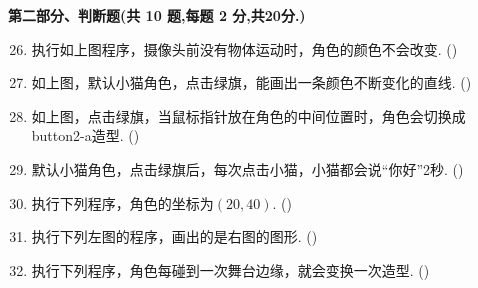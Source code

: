 \documentclass[10pt, a4paper]{article}
\begin{document}
    {\noindent\textbf{第二部分、判断题(共 10 题,每题 2 分,共20分.)}}
    \begin{enumerate}
        \setcounter{enumi}{25}
        \item 执行如上图程序，摄像头前没有物体运动时，角色的颜色不会改变. (\qquad)

        \item 如上图，默认小猫角色，点击绿旗，能画出一条颜色不断变化的直线. (\qquad)

        \item 如上图，点击绿旗，当鼠标指针放在角色的中间位置时，角色会切换成button2-a造型. (\qquad)
  
        \item 默认小猫角色，点击绿旗后，每次点击小猫，小猫都会说“你好”2秒. (\qquad)
        
        \item 执行下列程序，角色的坐标为$(20, 40)$. (\qquad)
        
        \item 执行下列左图的程序，画出的是右图的图形. (\qquad)
        
        \item 执行下列程序，角色每碰到一次舞台边缘，就会变换一次造型. (\qquad)
        

\end{enumerate}
\end{document}
